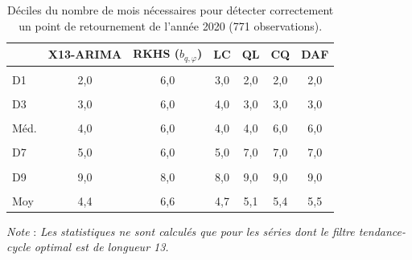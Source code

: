 \documentclass[
  11pt,
  french,
  a4paper]{article}
\newcommand\1{\mathds{1}}
\begin{document}
\begin{table}[!h]

\caption{\label{tab:covid-quantile}Déciles du nombre de mois nécessaires pour détecter correctement un point de retournement de l'année 2020 (771 observations).}
\centering
\begin{tabular}[t]{lcccccc}
\toprule
  & X13-ARIMA & RKHS ($b_{q,\varphi}$) & LC & QL & CQ & DAF\\
\midrule
\cellcolor{gray!6}{Min} & \cellcolor{gray!6}{2,0} & \cellcolor{gray!6}{2,0} & \cellcolor{gray!6}{2,0} & \cellcolor{gray!6}{2,0} & \cellcolor{gray!6}{2,0} & \cellcolor{gray!6}{2,0}\\
D1 & 2,0 & 6,0 & 3,0 & 2,0 & 2,0 & 2,0\\
\cellcolor{gray!6}{D2} & \cellcolor{gray!6}{3,0} & \cellcolor{gray!6}{6,0} & \cellcolor{gray!6}{3,0} & \cellcolor{gray!6}{3,0} & \cellcolor{gray!6}{2,0} & \cellcolor{gray!6}{2,0}\\
D3 & 3,0 & 6,0 & 4,0 & 3,0 & 3,0 & 3,0\\
\cellcolor{gray!6}{D4} & \cellcolor{gray!6}{3,0} & \cellcolor{gray!6}{6,0} & \cellcolor{gray!6}{4,0} & \cellcolor{gray!6}{4,0} & \cellcolor{gray!6}{5,0} & \cellcolor{gray!6}{5,0}\\
\addlinespace
Méd. & 4,0 & 6,0 & 4,0 & 4,0 & 6,0 & 6,0\\
\cellcolor{gray!6}{D6} & \cellcolor{gray!6}{4,0} & \cellcolor{gray!6}{6,0} & \cellcolor{gray!6}{4,0} & \cellcolor{gray!6}{6,0} & \cellcolor{gray!6}{6,0} & \cellcolor{gray!6}{6,0}\\
D7 & 5,0 & 6,0 & 5,0 & 7,0 & 7,0 & 7,0\\
\cellcolor{gray!6}{D8} & \cellcolor{gray!6}{5,0} & \cellcolor{gray!6}{7,0} & \cellcolor{gray!6}{5,0} & \cellcolor{gray!6}{7,0} & \cellcolor{gray!6}{8,0} & \cellcolor{gray!6}{8,0}\\
D9 & 9,0 & 8,0 & 8,0 & 9,0 & 9,0 & 9,0\\
\addlinespace
\cellcolor{gray!6}{Max} & \cellcolor{gray!6}{14,0} & \cellcolor{gray!6}{14,0} & \cellcolor{gray!6}{14,0} & \cellcolor{gray!6}{14,0} & \cellcolor{gray!6}{14,0} & \cellcolor{gray!6}{14,0}\\
Moy & 4,4 & 6,6 & 4,7 & 5,1 & 5,4 & 5,5\\
\bottomrule
\end{tabular}
\footnotesize


\emph{Note} : \emph{Les statistiques ne sont calculés que pour les séries dont le filtre tendance-cycle optimal est de longueur 13.}
\normalsize\end{table}
\end{document}

